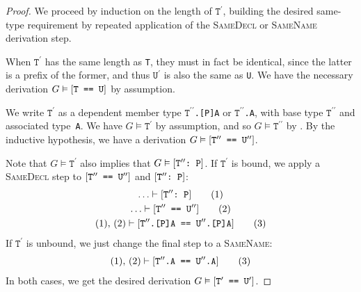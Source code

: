 \documentclass[../generics]{subfiles}
\begin{document}
\begin{proof}
We proceed by induction on the length of $\texttt{T}^\prime$, building the desired same-type requirement by repeated application of the \textsc{SameDecl} or \textsc{SameName} derivation step.

\BaseCase When $\texttt{T}^\prime$ has the same length as \texttt{T}, they must in fact be identical, since the latter is a prefix of the former, and thus $\texttt{U}^\prime$ is also the same as \texttt{U}. We have the necessary derivation $G\vDash[\texttt{T == U}]$ by assumption.

\InductiveStep We write $\texttt{T}^\prime$ as a dependent member type \texttt{$\texttt{T}^{\prime\prime}$.[P]A} or \texttt{$\texttt{T}^{\prime\prime}$.A}, with base type $\texttt{T}^{\prime\prime}$ and associated type~\texttt{A}. We have $G\vDash\texttt{T}^\prime$ by assumption, and so $G\vDash\texttt{T}^{\prime\prime}$ by . By the inductive hypothesis, we have a derivation $G\vDash[\texttt{$\texttt{T}^{\prime\prime}$ == $\texttt{U}^{\prime\prime}$}]$.

Note that $G\vDash\texttt{T}^\prime$ also implies that $G\vDash[\texttt{$\texttt{T}^{\prime\prime}$:~P}]$. If $\texttt{T}^\prime$ is bound, we apply a \textsc{SameDecl} step to $[\texttt{$\texttt{T}^{\prime\prime}$ == $\texttt{U}^{\prime\prime}$}]$ and $[\texttt{$\texttt{T}^{\prime\prime}$:~P}]$:
\begin{gather*}
\ldots\vdash[\texttt{$\texttt{T}^{\prime\prime}$:~P}]\tag{1}\\
\ldots\vdash[\texttt{$\texttt{T}^{\prime\prime}$ == $\texttt{U}^{\prime\prime}$}]\tag{2}\\
(1),\,(2)\vdash[\texttt{$\texttt{T}^{\prime\prime}$.[P]A == $\texttt{U}^{\prime\prime}$.[P]A}]\tag{3}
\end{gather*}
If $\texttt{T}^\prime$ is unbound, we just change the final step to a \textsc{SameName}:
\begin{gather*}
(1),\,(2)\vdash[\texttt{$\texttt{T}^{\prime\prime}$.A == $\texttt{U}^{\prime\prime}$.A}]\tag{3}
\end{gather*}
In both cases, we get the desired derivation $G\vDash[\texttt{$\texttt{T}^\prime$ == $\texttt{U}^\prime$}]$.
\end{proof}
\end{document}
